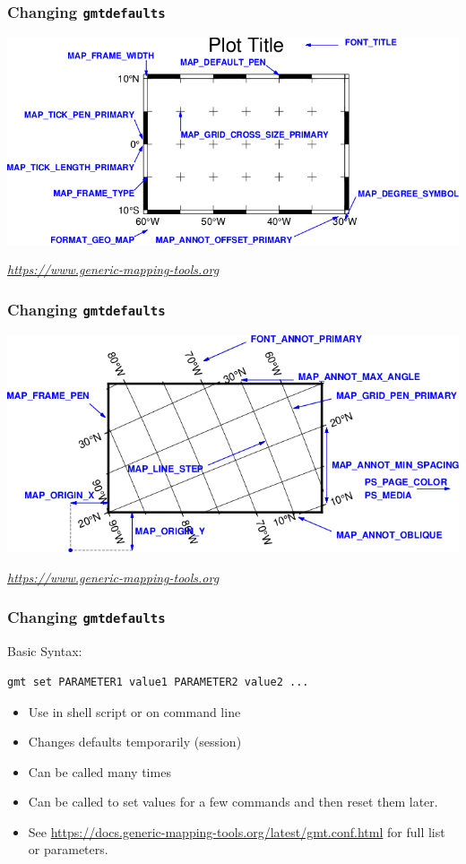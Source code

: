 \documentclass[unknownkeysallowed]{beamer}
\begin{document}
\begin{frame}
\frametitle{Changing {\tt gmtdefaults}}
	\begin{center}
		\includegraphics[width=\textwidth]{../figures/gmt_defaults_1a.png}	
	\end{center}
	\begin{flushright}
	\tiny{\emph{\url{https://www.generic-mapping-tools.org}}}
	\end{flushright}	
\end{frame}

\begin{frame}
\frametitle{Changing {\tt gmtdefaults}}
	\begin{center}
		\includegraphics[width=\textwidth]{../figures/gmt_defaults_1b.png}	
	\end{center}
	\begin{flushright}
	\tiny{\emph{\url{https://www.generic-mapping-tools.org}}}
	\end{flushright}	
\end{frame}

\begin{frame}[fragile=singleslide]
\frametitle{Changing {\tt gmtdefaults}}
Basic Syntax:
\begin{verbatim}
gmt set PARAMETER1 value1 PARAMETER2 value2 ...
\end{verbatim}		
	\begin{itemize}
		\item Use in shell script or on command line
		\item Changes defaults temporarily (session)
		\item Can be called many times
		\item Can be called to set values for a few commands and then reset them later.
		\item See \url{https://docs.generic-mapping-tools.org/latest/gmt.conf.html} for full list or parameters.
	\end{itemize}
\end{frame}
\end{document}
